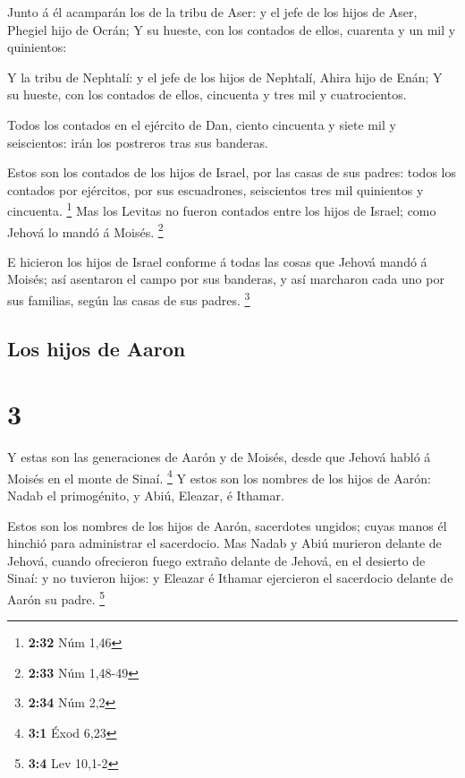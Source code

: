  Junto á él acamparán los de la tribu de Aser: y el jefe
de los hijos de Aser, Phegiel hijo de Ocrán;  Y su
hueste, con los contados de ellos, cuarenta y un mil y quinientos:

 Y la tribu de Nephtalí: y el jefe de los hijos de
Nephtalí, Ahira hijo de Enán;  Y su hueste, con los
contados de ellos, cincuenta y tres mil y cuatrocientos.

 Todos los contados en el ejército de Dan, ciento
cincuenta y siete mil y seiscientos: irán los postreros tras sus
banderas.

 Estos son los contados de los hijos de Israel, por las
casas de sus padres: todos los contados por ejércitos, por sus
escuadrones, seiscientos tres mil quinientos y cincuenta. \footnote{\textbf{2:32}
  Núm 1,46}  Mas los Levitas no fueron contados entre los
hijos de Israel; como Jehová lo mandó á Moisés. \footnote{\textbf{2:33}
  Núm 1,48-49}

 E hicieron los hijos de Israel conforme á todas las
cosas que Jehová mandó á Moisés; así asentaron el campo por sus
banderas, y así marcharon cada uno por sus familias, según las casas de
sus padres. \footnote{\textbf{2:34} Núm 2,2}

\hypertarget{los-hijos-de-aaron}{%
\subsection{Los hijos de Aaron}\label{los-hijos-de-aaron}}

\hypertarget{section-2}{%
\section{3}\label{section-2}}

 Y estas son las generaciones de Aarón y de Moisés, desde
que Jehová habló á Moisés en el monte de Sinaí. \footnote{\textbf{3:1}
  Éxod 6,23}  Y estos son los nombres de los hijos de
Aarón: Nadab el primogénito, y Abiú, Eleazar, é Ithamar.

 Estos son los nombres de los hijos de Aarón, sacerdotes
ungidos; cuyas manos él hinchió para administrar el sacerdocio.
 Mas Nadab y Abiú murieron delante de Jehová, cuando
ofrecieron fuego extraño delante de Jehová, en el desierto de Sinaí: y
no tuvieron hijos: y Eleazar é Ithamar ejercieron el sacerdocio delante
de Aarón su padre. \footnote{\textbf{3:4} Lev 10,1-2}

